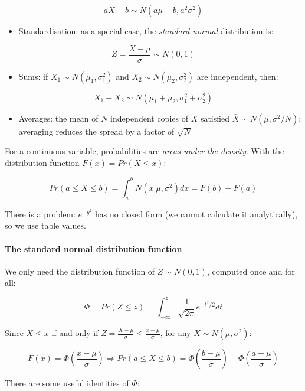 \documentclass{article}
\begin{document}
\[aX + b \sim N(a\mu + b, a^2 \sigma^2)\]

\begin{itemize}
\tightlist
\item
  Standardisation: as a special case, the \emph{standard normal}
  distribution is:
\end{itemize}

\[Z = \frac{X - \mu}{\sigma} \sim N(0, 1)\]

\begin{itemize}
\tightlist
\item
  Sums: if \(X_1 \sim N(\mu_1, \sigma_1^2)\) and
  \(X_2 \sim N(\mu_2, \sigma_2^2)\) are independent, then:
\end{itemize}

\[X_1 + X_2 \sim N(\mu_1 + \mu_2, \sigma^2_1 + \sigma_2^2)\]

\begin{itemize}
\tightlist
\item
  Averages: the mean of \(N\) independent copies of \(X\) satisfied
  \(\bar{X} \sim
  N(\mu , \sigma^2 / N)\): averaging reduces the spread by a factor of
  \(\sqrt{N}\)
\end{itemize}

For a continuous variable, probabilities are \emph{areas under the
density}. With the distribution function \(F(x) = Pr(X\le x)\):

\[Pr(a\le X \le b) = \int_a^b N(x|\mu, \sigma^2) dx = F(b) - F(a)\]

There is a problem: \(e^{-y^2}\) has no closed form (we cannot calculate
it analytically), so we use table values.

\paragraph{The standard normal distribution
function}\label{the-standard-normal-distribution-function}

We only need the distribution function of \(Z\sim N(0, 1)\), computed
once and for all:

\[\Phi = Pr(Z\le z) = \int_{-\infty}^z \frac{1}{\sqrt{2\pi}} e^{-t^2 / 2} dt\]

Since \(X \le x\) if and only if
\(Z = \frac{X - \mu }{\sigma } \le \frac{x - \mu}{\sigma}\), for any
\(X \sim N(\mu, \sigma^2)\):

\[F(x) = \Phi (\frac{x- \mu}{\sigma}) \Rightarrow Pr(a \le X \le b) =
\Phi(\frac{b - \mu}{\sigma}) - \Phi (\frac{a - \mu}{\sigma})\]

There are some useful identities of \(\Phi\):
\end{document}
